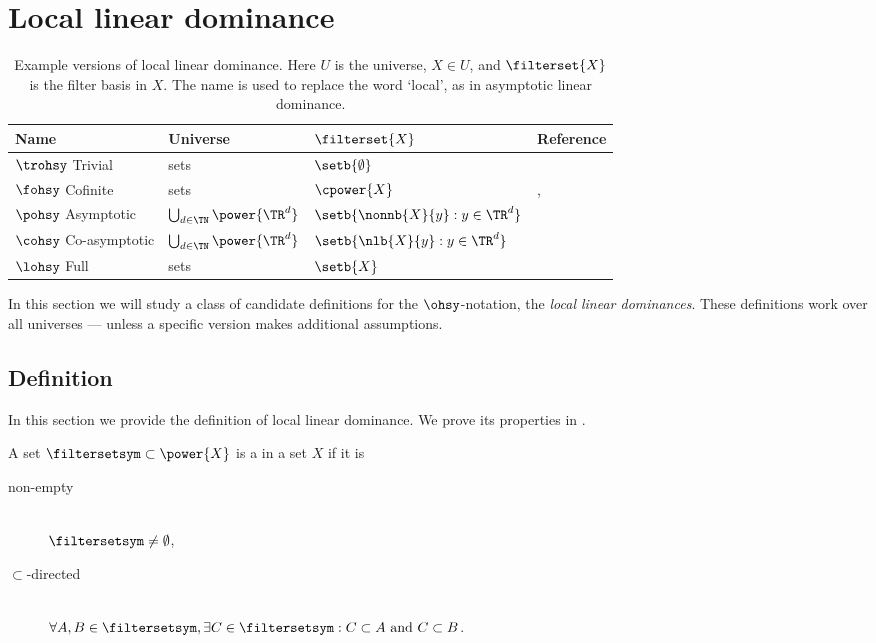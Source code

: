 \documentclass[b5paper, english, oneside]{memoir}
\begin{document}
\chapter{Local linear dominance}
\label{LocalLinearDominance}

\begin{table}
\begin{tabular}{|l|l|l|l|}
\hline 
Name & Universe & $\filterset{X}$ & Reference \\
\hline 
\hline
$\trohsy$ Trivial &
sets &
$\setb{\emptyset}$ &
\cite{ONotationBeatcs} \\
\hline 
$\fohsy$ Cofinite & 
sets &
$\cpower{X}$ & 
\cite{DesignAndAnalysisOfComputerAlgorithms}, \cite{ONotationBeatcs} \\
\hline 
$\pohsy$ Asymptotic &
$\bigcup_{d \in \TN} \power{\TR^d}$ &
$\setb{\nonnb{X}{y} : y \in \TR^d}$ &
\cite{IntroAlgo} \\
\hline 
$\cohsy$ Co-asymptotic &
$\bigcup_{d \in \TN} \power{\TR^d}$ &
$\setb{\nlb{X}{y} : y \in \TR^d}$ &
\cite{IntroAlgo2009} \\
\hline 
$\lohsy$ Full &
sets &
$\setb{X}$ & 
\cite{ONotationBeatcs} \\
\hline 
\end{tabular}
\centering
\caption{Example versions of local linear dominance. Here $U$ is the universe, $X \in U$, and $\filterset{X}$ is the filter basis in $X$. The name is used to replace the word `local', as in asymptotic linear dominance.}
\label{ExamplesOfLocalLinearDominances}
\end{table}

In this section we will study a class of candidate definitions for the $\ohsy$-notation, the \emph{local linear dominances}. These definitions work over all universes --- unless a specific version makes additional assumptions. 

\section{Definition}

In this section we provide the definition of local linear dominance. We prove its properties in .

\begin{definition}
A set $\filtersetsym \subset \power{X}$ is a  in a set $X$ if it is
\begin{description}
\item[non-empty] \hfill \\ 
$\filtersetsym \neq \emptyset$,
\item[$\subset$-directed] \hfill \\
$\forall A, B \in \filtersetsym, \exists C \in \filtersetsym : C \subset A \textrm{ and } C \subset B$.
\end{description}
\end{definition}
\end{document}
